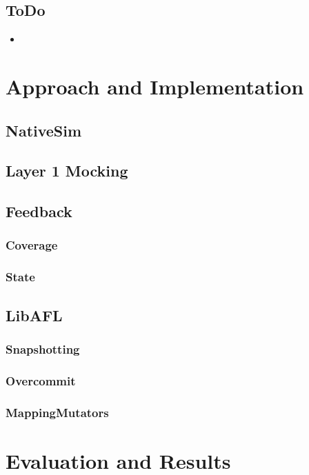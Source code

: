 \documentclass{article}
\let\savedCite=\cite
\renewcommand{\cite}{\unskip~\savedCite}
\begin{document}
\begin{multicols}{2}
  \subsection{ToDo}
  \begin{itemize}
    \item {}\cite{Survey}
  \end{itemize}

  \section{Approach and Implementation}

  \subsection{NativeSim}

  \subsection{Layer 1 Mocking}

  \subsection{Feedback}

  \subsubsection{Coverage}
  \subsubsection{State}

  \subsection{LibAFL}
  \subsubsection{Snapshotting}
  \subsubsection{Overcommit}
  \subsubsection{MappingMutators}

  \section{Evaluation and Results}



\end{multicols}
\end{document}
